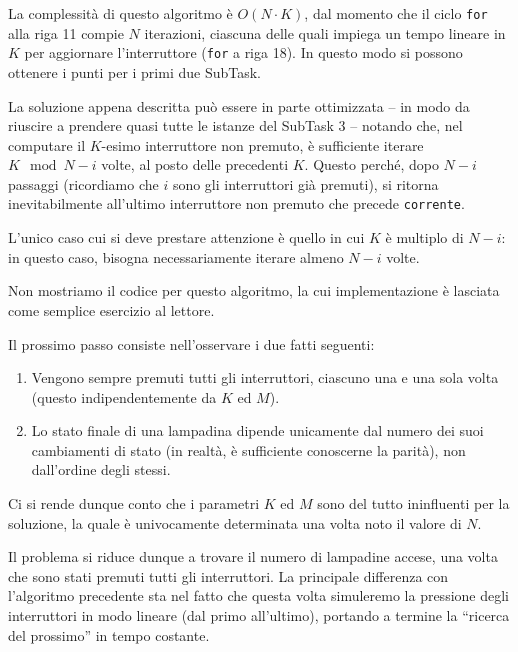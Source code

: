     La complessità di questo algoritmo è $O(N \cdot K)$, dal momento che il ciclo \texttt{for} alla riga 11 compie $N$ iterazioni, ciascuna delle quali impiega un tempo lineare in $K$ per aggiornare l'interruttore (\texttt{for} a riga 18). In questo modo si possono ottenere i punti per i primi due SubTask.
    
    \NQuadroLenta
    
    La soluzione appena descritta può essere in parte ottimizzata -- in modo da riuscire a prendere quasi tutte le istanze del SubTask 3 -- notando che, nel computare il $K$-esimo interruttore non premuto, è sufficiente iterare $K \mod{N - i}$ volte, al posto delle precedenti $K$. Questo perché, dopo $N - i$ passaggi (ricordiamo che $i$ sono gli interruttori già premuti), si ritorna inevitabilmente all'ultimo interruttore non premuto che precede \texttt{corrente}.
    
    L'unico caso cui si deve prestare attenzione è quello in cui $K$ è multiplo di $N - i$: in questo caso, bisogna necessariamente iterare almeno $N - i$ volte.
    
    Non mostriamo il codice per questo algoritmo, la cui implementazione è lasciata come semplice esercizio al lettore.
    
    \NlogN
    
    Il prossimo passo consiste nell'osservare i due fatti seguenti:
    \begin{enumerate}
        \item Vengono sempre premuti tutti gli interruttori, ciascuno una e una sola volta (questo indipendentemente da $K$ ed $M$).
        \item Lo stato finale di una lampadina dipende unicamente dal numero dei suoi cambiamenti di stato (in realtà, è sufficiente conoscerne la parità), non dall'ordine degli stessi.
    \end{enumerate}
    
    Ci si rende dunque conto che i parametri $K$ ed $M$ sono del tutto ininfluenti per la soluzione, la quale è univocamente determinata una volta noto il valore di $N$.
    
    Il problema si riduce dunque a trovare il numero di lampadine accese, una volta che sono stati premuti tutti gli interruttori. La principale differenza con l'algoritmo precedente sta nel fatto che questa volta simuleremo la pressione degli interruttori in modo lineare (dal primo all'ultimo), portando a termine la ``ricerca del prossimo'' in tempo costante.
    
